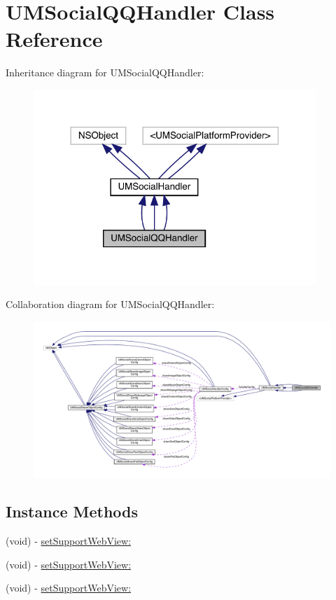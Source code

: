 \hypertarget{interface_u_m_social_q_q_handler}{}\section{U\+M\+Social\+Q\+Q\+Handler Class Reference}
\label{interface_u_m_social_q_q_handler}


Inheritance diagram for U\+M\+Social\+Q\+Q\+Handler\+:\nopagebreak
\begin{figure}[H]
\begin{center}
\leavevmode
\includegraphics[width=302pt]{interface_u_m_social_q_q_handler__inherit__graph}
\end{center}
\end{figure}


Collaboration diagram for U\+M\+Social\+Q\+Q\+Handler\+:\nopagebreak
\begin{figure}[H]
\begin{center}
\leavevmode
\includegraphics[width=350pt]{interface_u_m_social_q_q_handler__coll__graph}
\end{center}
\end{figure}
\subsection*{Instance Methods}
\begin{DoxyCompactItemize}
\item 
(void) -\/ \mbox{\hyperlink{interface_u_m_social_q_q_handler_a22e62d8b1b36ab0cef2e16e2377f2b1e}{set\+Support\+Web\+View\+:}}
\item 
(void) -\/ \mbox{\hyperlink{interface_u_m_social_q_q_handler_a22e62d8b1b36ab0cef2e16e2377f2b1e}{set\+Support\+Web\+View\+:}}
\item 
(void) -\/ \mbox{\hyperlink{interface_u_m_social_q_q_handler_a22e62d8b1b36ab0cef2e16e2377f2b1e}{set\+Support\+Web\+View\+:}}
\end{DoxyCompactItemize}
